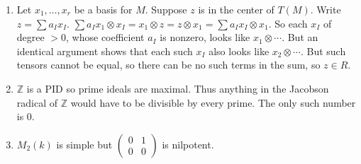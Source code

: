 \documentclass{article}
\newcommand\ZZ{\mathbb Z}
\begin{document}
\begin{enumerate}
  \item Let $x_1,\dotsc,x_r$ be a basis for $M$. Suppose $z$ is in the center of
     $T(M)$. Write $z = \sum a_Ix_I$. $\sum a_I x_1\otimes x_I = x_1\otimes z =
     z \otimes x_1 = \sum a_I x_I \otimes x_1$. So each $x_I$ of degree $>0$,
     whose coefficient $a_I$ is nonzero, looks like $x_1 \otimes \dotsb$. But
     an identical argument shows that each such $x_I$ also looks like $x_2
     \otimes \dotsb$. But such tensors cannot be equal, so there can be no such
     terms in the sum, so $z \in R$.

  \item $\ZZ$ is a PID so prime ideals are maximal. Thus anything in the
     Jacobson radical of $\ZZ$ would have to be divisible by every prime. The
     only such number is 0.

  \item $M_2(k)$ is simple but $\begin{pmatrix}0&1\\0&0\end{pmatrix}$ is
     nilpotent.

\end{enumerate}
\end{document}
